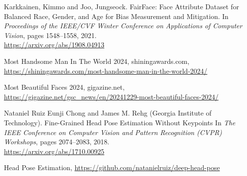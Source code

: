 \documentclass[a4paper,11pt,titlepage]{jsarticle}
\begin{document}
\begin{thebibliography}{9}
    Karkkainen, Kimmo and Joo, Jungseock.
    FairFace: Face Attribute Dataset for Balanced Race, Gender, and Age for Bias Measurement and Mitigation.
    In \textit{Proceedings of the IEEE/CVF Winter Conference on Applications of Computer Vision}, pages 1548--1558, 2021.\\
        \url{https://arxiv.org/abs/1908.04913}
    
    Most Handsome Man In The World 2024, shiningawards.com, \\
    \url{https://shiningawards.com/most-handsome-man-in-the-world-2024/}
    
    Most Beautiful Faces 2024, gigazine.net, \\ \url{https://gigazine.net/gsc_news/en/20241229-most-beautiful-faces-2024/}
    
        Nataniel Ruiz Eunji Chong and James M. Rehg (Georgia Institute of Technology).
        Fine-Grained Head Pose Estimation Without Keypoints
         In \textit{The IEEE Conference on Computer Vision and Pattern Recognition (CVPR) Workshops}, pages 2074--2083, 2018. \\
          \url{https://arxiv.org/abs/1710.00925}

    Head Pose Estimation, \url{https://github.com/natanielruiz/deep-head-pose}
\end{thebibliography}
\end{document}
